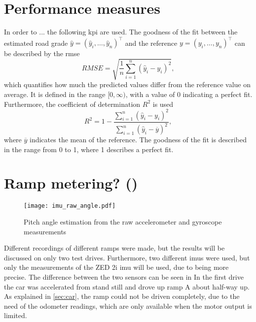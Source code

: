 \section{Performance measures}
In order to ...
the following \gls{kpi} are used.
The goodness of the fit between the estimated road grade $\hat{y} = (\hat{y}_i, \dots, \hat{y}_n)^\intercal$ and the reference $y = (y_i, \dots, y_n)^\intercal$ can be described by the \gls{rmse}
\begin{equation}
    RMSE = \sqrt{\frac{1}{n}\sum_{i = 1}^n(\hat{y}_i - y_i)^2},
\end{equation}
which quantifies how much the predicted values differ from the reference value on average.
It is defined in the range $[0, \infty)$, with a value of 0 indicating a perfect fit.
Furthermore, the coefficient of determination $R^2$ is used
\begin{equation}
    R^2 = 1 - \frac{\sum\limits_{i = 1}^n(\hat{y}_i - y_i)^2}{\sum\limits_{i = 1}^n(\hat{y}_i - \overline{y})^2},
\end{equation}
where $\overline{y}$ indicates the mean of the reference.
The goodness of the fit is described in the range from 0 to 1, where 1 describes a perfect fit.\\



\section{Ramp metering? ()}
\begin{figure}[htbp]
    \centering
    \texttt{[image: imu\_raw\_angle.pdf]}
    \caption[Raw]{Pitch angle estimation from the raw accelerometer and gyroscope measurements}
    \label{fig:imu_raw_angle}
\end{figure}
Different recordings of different ramps were made, but the results will be discussed on only two test drives.
Furthermore, two different \glspl{imu} were used, but only the measurements of the ZED 2i \gls{imu} will be used, due to being more precise.
The difference between the two sensors can be seen in
In the first drive the car was accelerated from stand still and drove up ramp A about half-way up.
As explained in \cref{sec:car}, the ramp could not be driven completely, due to the need of the odometer readings, which are only available when the motor output is limited.
